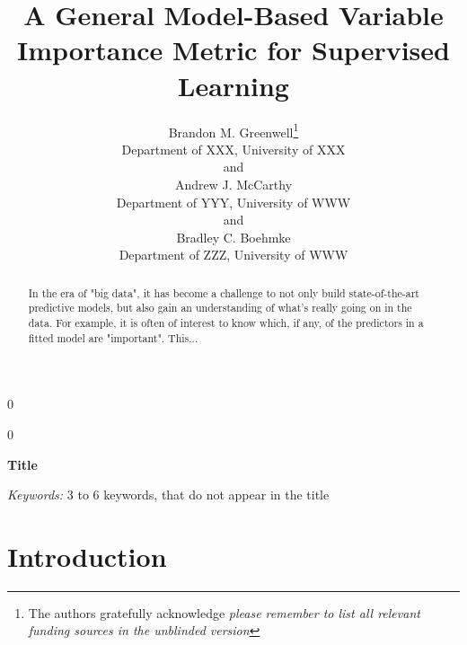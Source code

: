 \documentclass[12pt]{article}
\newcommand{\blind}{0}
\begin{document}
%

\def\spacingset#1{\renewcommand{\baselinestretch}%
{#1}\small\normalsize} \spacingset{1}



\blind
{
  \title{\bf A General Model-Based Variable Importance Metric for Supervised Learning}
  \author{Brandon M. Greenwell\thanks{
    The authors gratefully acknowledge \textit{please remember to list all relevant funding sources in the unblinded version}}\hspace{.2cm}\\
    Department of XXX, University of XXX\\
    and \\
    Andrew J. McCarthy \\
    Department of YYY, University of WWW \\
    and \\
    Bradley C. Boehmke \\
    Department of ZZZ, University of WWW }
  \maketitle
} \fi

\blind
{
  \bigskip
  \bigskip
  \bigskip
  \begin{center}
    {\LARGE\bf Title}
\end{center}
  \medskip
} \fi

\bigskip
\begin{abstract}
In the era of "big data", it has become a challenge to not only build state-of-the-art predictive models, but also gain an understanding of what's really going on in the data. For example, it is often of interest to know which, if any, of the predictors in a fitted model are "important". This...
\end{abstract}

\noindent%
{\it Keywords:}  3 to 6 keywords, that do not appear in the title
\vfill

\newpage
\spacingset{1.45} %


\section{Introduction}
\label{sec:introduction}
\end{document}
